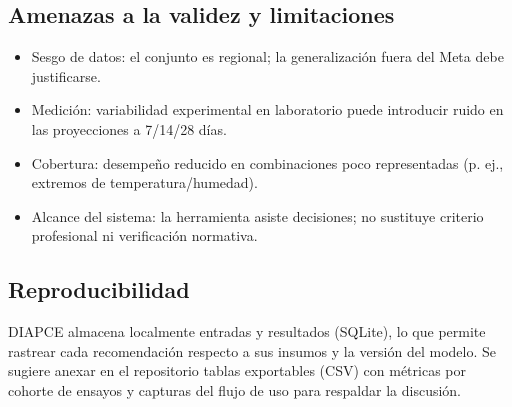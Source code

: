 \subsection{Amenazas a la validez y limitaciones}
\begin{itemize}
  \item Sesgo de datos: el conjunto es regional; la generalización fuera del Meta debe justificarse.
  \item Medición: variabilidad experimental en laboratorio puede introducir ruido en las proyecciones a 7/14/28 días.
  \item Cobertura: desempeño reducido en combinaciones poco representadas (p. ej., extremos de temperatura/humedad).
  \item Alcance del sistema: la herramienta asiste decisiones; no sustituye criterio profesional ni verificación normativa.
\end{itemize}

\subsection{Reproducibilidad}
DIAPCE almacena localmente entradas y resultados (SQLite), lo que permite rastrear cada recomendación respecto a sus insumos y la versión del modelo. Se sugiere anexar en el repositorio tablas exportables (CSV) con métricas por cohorte de ensayos y capturas del flujo de uso para respaldar la discusión.
